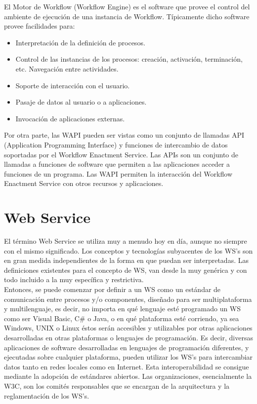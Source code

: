 El Motor de Workflow (Workflow Engine) es el software que provee el control del ambiente de ejecución de una instancia de Workflow. Típicamente dicho software provee facilidades para:

\begin{itemize}
	\item Interpretación de la definición de procesos.
	
	\item Control de las instancias de los procesos: creación, activación, terminación, etc. Navegación entre actividades.
	
	\item Soporte de interacción con el usuario.
	
	\item Pasaje de datos al usuario o a aplicaciones.
	
	\item Invocación de aplicaciones externas.
\end{itemize}

Por otra parte, las WAPI pueden ser vistas como un conjunto de llamadas API (Application Programming Interface) y funciones de intercambio de datos soportadas por el Workflow Enactment Service. Las APIs son un conjunto de llamadas a funciones de software que permiten a las aplicaciones acceder a funciones de un programa. Las WAPI permiten la interacción del Workflow Enactment Service con otros recursos y aplicaciones.

\section{Web Service}
\label{Web Service}

El término Web Service se utiliza muy a menudo hoy en día, aunque no siempre con el mismo significado. Los conceptos y tecnologías subyacentes de los WS's son en gran medida independientes de la forma en que puedan ser interpretadas. Las definiciones existentes para el concepto de WS, van desde la muy genérica y con todo incluido a la muy específica y restrictiva.\\

Entonces, se puede comenzar por definir a un WS como un estándar de comunicación entre procesos y/o componentes, diseñado para ser multiplataforma y multilenguaje, es decir, no importa en qué lenguaje esté programado un WS como ser Visual Basic, C\# o Java, o en qué plataforma esté corriendo, ya sea Windows, UNIX o Linux éstos serán accesibles y utilizables por otras aplicaciones desarrolladas en otras plataformas o lenguajes de programación. Es decir, diversas aplicaciones de software desarrolladas en lenguajes de programación diferentes, y ejecutadas sobre cualquier plataforma, pueden utilizar los WS's para intercambiar datos tanto en redes locales como en Internet. Esta interoperabilidad se consigue mediante la adopción de estándares abiertos. Las organizaciones, esencialmente la W3C, son los comités responsables que se encargan de la arquitectura y la reglamentación de los WS's.\\

